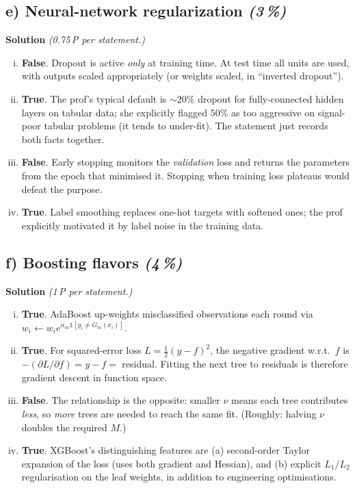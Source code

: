 \documentclass[11pt,a4paper]{article}
\newcommand{\subpoints}[1]{\textit{(#1\,\%)}}
\newcommand{\sol}{\noindent\textbf{Solution}}
\begin{document}
\subsection*{e) Neural-network regularization \subpoints{3}}
\sol{} \emph{(0.75\,P per statement.)}
\begin{enumerate}[(i)]
  \item \textbf{False}. Dropout is active \emph{only} at training time. At test time all units are
        used, with outputs scaled appropriately (or weights scaled, in ``inverted dropout'').
  \item \textbf{True}. The prof's typical default is $\sim 20\%$ dropout for fully-connected
        hidden layers on tabular data; she explicitly flagged $50\%$ as too aggressive on
        signal-poor tabular problems (it tends to under-fit). The statement just records both
        facts together.
  \item \textbf{False}. Early stopping monitors the \emph{validation} loss and returns the
        parameters from the epoch that minimised it. Stopping when training loss plateaus would
        defeat the purpose.
  \item \textbf{True}. Label smoothing replaces one-hot targets with softened ones; the prof
        explicitly motivated it by label noise in the training data.
\end{enumerate}

\subsection*{f) Boosting flavors \subpoints{4}}
\sol{} \emph{(1\,P per statement.)}
\begin{enumerate}[(i)]
  \item \textbf{True}. AdaBoost up-weights misclassified observations each round via
        $w_i \leftarrow w_i e^{\alpha_m \mathbb{1}[y_i\neq G_m(x_i)]}$.
  \item \textbf{True}. For squared-error loss $L=\tfrac{1}{2}(y-f)^2$, the negative gradient w.r.t.\
        $f$ is $-(\partial L/\partial f) = y-f =$ residual. Fitting the next tree to residuals is
        therefore gradient descent in function space.
  \item \textbf{False}. The relationship is the opposite: smaller $\nu$ means each tree contributes
        \emph{less}, so \emph{more} trees are needed to reach the same fit. (Roughly: halving $\nu$
        doubles the required $M$.)
  \item \textbf{True}. XGBoost's distinguishing features are (a) second-order Taylor expansion of
        the loss (uses both gradient and Hessian), and (b) explicit $L_1/L_2$ regularisation on the
        leaf weights, in addition to engineering optimisations.
\end{enumerate}
\end{document}
